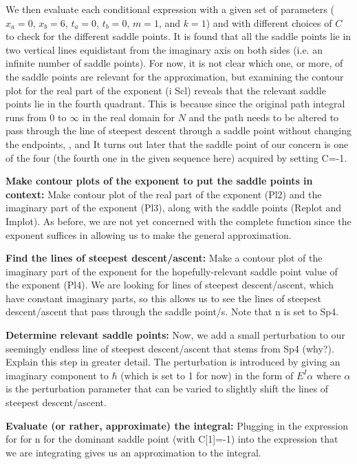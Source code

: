 \documentclass[12pt]{revtex4}
\begin{document}
We then evaluate each conditional expression with a given set of parameters ($x_a=0$, $x_b=6$, $t_a=0$, $t_b=0$, $m=1$, and $k=1$) and with different choices of $C$ to check for the different saddle points. It is found that all the saddle points lie in two vertical lines equidistant from the imaginary axis on both sides (i.e. an infinite number of saddle points). For now, it is not clear which one, or more, of the saddle points are relevant for the approximation, but examining the contour plot for the real part of the exponent (i Scl) reveals that the relevant saddle points lie in the fourth quadrant. This is because since the original path integral runs from 0 to $\infty$ in the real domain for $N$ and the path needs to be altered to pass through the line of steepest descent through a saddle point without changing the endpoints, , and It turns out later that the saddle point of our concern is one of the four (the fourth one in the given sequence here) acquired by setting C=-1.

\textbf{Make contour plots of the exponent to put the saddle points in context:}
Make contour plot of the real part of the exponent (Pl2) and the imaginary part of the exponent (Pl3), along with the saddle points (Replot and Implot). As before, we are not yet concerned with the complete function since the exponent suffices in allowing us to make the general approximation.

\textbf{Find the lines of steepest descent/ascent:}
Make a contour plot of the imaginary part of the exponent for the hopefully-relevant saddle point value of the exponent (Pl4). We are looking for lines of steepest descent/ascent, which have constant imaginary parts, so this allows us to see the lines of steepest descent/ascent that pass through the saddle point/s. Note that n is set to Sp4.

\textbf{Determine relevant saddle points:}
Now, we add a small perturbation to our seemingly endless line of steepest descent/ascent that stems from Sp4 (why?). Explain this step in greater detail. The perturbation is introduced by giving an imaginary component to $\hbar$ (which is set to 1 for now) in the form of $E^I\alpha$ where $\alpha$ is the perturbation parameter that can be varied to slightly shift the lines of steepest descent/ascent.

\textbf{Evaluate (or rather, approximate) the integral:}
Plugging in the expression for  for n for the dominant saddle point (with C[1]=-1) into the expression that we are integrating gives us an approximation to the integral.
\end{document}
